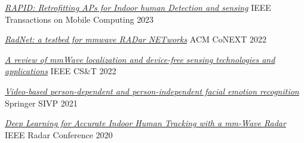 
\begin{cvhonors}

  \cvhonor
    {\href{https://ieeexplore.ieee.org/abstract/document/10172159}{\emph{RAPID: Retrofitting APs for Indoor human Detection and sensing}}} %
    {IEEE Transactions on Mobile Computing} %
    {} %
    {2023} %

  
  \cvhonor
    {\href{https://dl.acm.org/doi/abs/10.1145/3565474.3569068}{\emph{RadNet: a testbed for mmwave RADar NETworks}}} %
    {ACM CoNEXT} %
    {} %
    {2022} %
    

  \cvhonor
    {\href{https://ieeexplore.ieee.org/abstract/document/9780203/}{\emph{A review of mmWave localization and device-free sensing technologies and applications}}} %
    {IEEE CS\&T} %
    {} %
    {2022} %
    

  \cvhonor
    {\href{https://link.springer.com/article/10.1007/s11760-020-01830-0}{\emph{Video-based person-dependent and person-independent facial emotion recognition}}} %
    {Springer SIVP} %
    {} %
    {2021} %
    

  \cvhonor
    {\href{https://ieeexplore.ieee.org/abstract/document/9266400}{\emph{Deep Learning for Accurate Indoor Human Tracking with a mm-Wave Radar}}} %
    {IEEE Radar Conference} %
    {} %
    {2020} %
    
\end{cvhonors}
